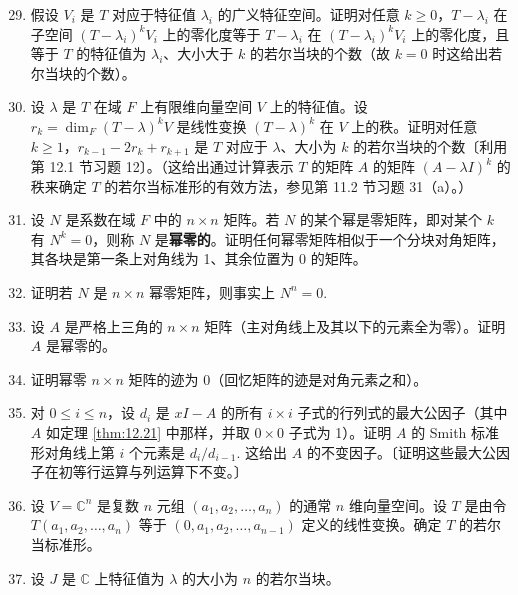 \begin{enumerate}
\setcounter{enumi}{28}
\item 假设 \(V_i\) 是 \(T\) 对应于特征值 \(\lambda_i\) 的广义特征空间。证明对任意 \(k \geq 0\)，\(T-\lambda_i\) 在子空间 \((T-\lambda_i)^kV_i\) 上的零化度等于 \(T-\lambda_i\) 在 \((T-\lambda_i)^kV_i\) 上的零化度，且等于 \(T\) 的特征值为 \(\lambda_i\)、大小大于 \(k\) 的若尔当块的个数（故 \(k = 0\) 时这给出若尔当块的个数）。

\item 设 \(\lambda\) 是 \(T\) 在域 \(F\) 上有限维向量空间 \(V\) 上的特征值。设 \(r_k = \dim_F (T-\lambda)^kV\) 是线性变换 \((T-\lambda)^k\) 在 \(V\) 上的秩。证明对任意 \(k \geq 1\)，\(r_{k-1}-2r_k+r_{k+1}\) 是 \(T\) 对应于 \(\lambda\)、大小为 \(k\) 的若尔当块的个数〔利用第 12.1 节习题 12〕。（这给出通过计算表示 \(T\) 的矩阵 \(A\) 的矩阵 \((A-\lambda I)^k\) 的秩来确定 \(T\) 的若尔当标准形的有效方法，参见第 11.2 节习题 31（a）。）

\item 设 \(N\) 是系数在域 \(F\) 中的 \(n \times n\) 矩阵。若 \(N\) 的某个幂是零矩阵，即对某个 \(k\) 有 \(N^k = 0\)，则称 \(N\) 是\textbf{幂零的}。证明任何幂零矩阵相似于一个分块对角矩阵，其各块是第一条上对角线为 1、其余位置为 0 的矩阵。

\item 证明若 \(N\) 是 \(n \times n\) 幂零矩阵，则事实上 \(N^n = 0\).

\item 设 \(A\) 是严格上三角的 \(n \times n\) 矩阵（主对角线上及其以下的元素全为零）。证明 \(A\) 是幂零的。

\item 证明幂零 \(n \times n\) 矩阵的迹为 0（回忆矩阵的迹是对角元素之和）。

\item 对 \(0 \leq i \leq n\)，设 \(d_i\) 是 \(xI-A\) 的所有 \(i \times i\) 子式的行列式的最大公因子（其中 \(A\) 如定理 \ref{thm:12.21} 中那样，并取 \(0 \times 0\) 子式为 1）。证明 \(A\) 的 Smith 标准形对角线上第 \(i\) 个元素是 \(d_i/d_{i-1}\). 这给出 \(A\) 的不变因子。〔证明这些最大公因子在初等行运算与列运算下不变。〕

\item 设 \(V = \mathbb{C}^n\) 是复数 \(n\) 元组 \((a_1, a_2, \ldots, a_n)\) 的通常 \(n\) 维向量空间。设 \(T\) 是由令 \(T(a_1, a_2, \ldots, a_n)\) 等于 \((0, a_1, a_2, \ldots, a_{n-1})\) 定义的线性变换。确定 \(T\) 的若尔当标准形。

\item 设 \(J\) 是 \(\mathbb{C}\) 上特征值为 \(\lambda\) 的大小为 \(n\) 的若尔当块。


\end{enumerate}
